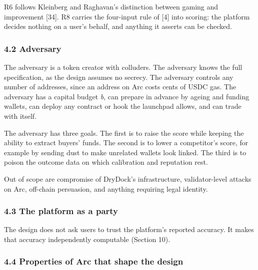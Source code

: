 R6 follows Kleinberg and Raghavan's distinction between gaming and improvement {[}34{]}. R8 carries the four-input rule of {[}4{]} into scoring: the platform decides nothing on a user's behalf, and anything it asserts can be checked.

\subsubsection{4.2 Adversary}\label{adversary}

The adversary is a token creator with colluders. The adversary knows the full specification, as the design assumes no secrecy. The adversary controls any number of addresses, since an address on Arc costs cents of USDC gas. The adversary has a capital budget \emph{b}, can prepare in advance by ageing and funding wallets, can deploy any contract or hook the launchpad allows, and can trade with itself.

The adversary has three goals. The first is to raise the score while keeping the ability to extract buyers' funds. The second is to lower a competitor's score, for example by sending dust to make unrelated wallets look linked. The third is to poison the outcome data on which calibration and reputation rest.

Out of scope are compromise of DryDock's infrastructure, validator-level attacks on Arc, off-chain persuasion, and anything requiring legal identity.

\subsubsection{4.3 The platform as a party}\label{the-platform-as-a-party}

The design does not ask users to trust the platform's reported accuracy. It makes that accuracy independently computable (Section 10).

\subsubsection{4.4 Properties of Arc that shape the design}\label{properties-of-arc-that-shape-the-design}

